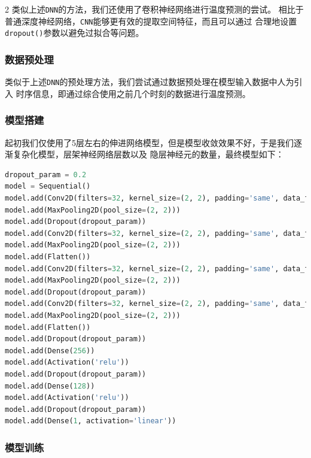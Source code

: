 \documentclass[11pt,a4paper]{elegantpaper}
\begin{document}
\begin{multicols}{2}
类似上述\lstinline{DNN}的方法，我们还使用了卷积神经网络进行温度预测的尝试。
相比于普通深度神经网络，\lstinline{CNN}能够更有效的提取空间特征，而且可以通过
合理地设置\lstinline{dropout()}参数以避免过拟合等问题。

\subsubsection{数据预处理}

类似于上述\lstinline{DNN}的预处理方法，我们尝试通过数据预处理在模型输入数据中人为引入
时序信息，即通过综合使用之前几个时刻的数据进行温度预测。

\subsubsection{模型搭建}

起初我们仅使用了5层左右的伸进网络模型，但是模型收敛效果不好，于是我们逐渐复杂化模型，层架神经网络层数以及
隐层神经元的数量，最终模型如下：

\begin{lstlisting}[language=Python]
dropout_param = 0.2
model = Sequential()
model.add(Conv2D(filters=32, kernel_size=(2, 2), padding='same', data_format='channels_last', input_shape=(width, height, 1), activation='relu'))
model.add(MaxPooling2D(pool_size=(2, 2)))
model.add(Dropout(dropout_param))
model.add(Conv2D(filters=32, kernel_size=(2, 2), padding='same', data_format='channels_last', input_shape=(width, height, 1), activation='relu'))
model.add(MaxPooling2D(pool_size=(2, 2)))
model.add(Flatten())
model.add(Conv2D(filters=32, kernel_size=(2, 2), padding='same', data_format='channels_last', input_shape=(width, height, 1), activation='relu'))
model.add(MaxPooling2D(pool_size=(2, 2)))
model.add(Dropout(dropout_param))
model.add(Conv2D(filters=32, kernel_size=(2, 2), padding='same', data_format='channels_last', input_shape=(width, height, 1), activation='relu'))
model.add(MaxPooling2D(pool_size=(2, 2)))
model.add(Flatten())
model.add(Dropout(dropout_param))
model.add(Dense(256))
model.add(Activation('relu'))
model.add(Dropout(dropout_param))
model.add(Dense(128))
model.add(Activation('relu'))
model.add(Dropout(dropout_param))
model.add(Dense(1, activation='linear'))
\end{lstlisting}

\subsubsection{模型训练}


\end{multicols}
\end{document}
